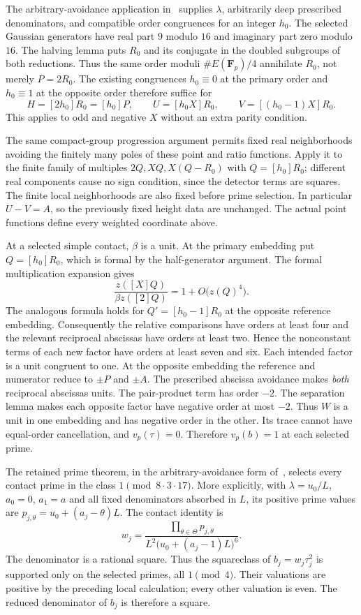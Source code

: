\documentclass[11pt,a4paper]{article}
\begin{document}
The arbitrary-avoidance application in~\cite[Section~2]{Primes}
supplies $\lambda$, arbitrarily deep prescribed denominators, and
compatible order congruences for an integer $h_0$.
The selected Gaussian generators have real part $9$ modulo $16$
and imaginary part zero modulo $16$. The halving lemma
\cite[Section~5]{Half} puts $R_0$ and its conjugate in the doubled
subgroups of both reductions. Thus the same order moduli
$\#E(\mathbf F_p)/4$ annihilate $R_0$, not merely $P=2R_0$.
The existing congruences $h_0\equiv0$ at the primary order and
$h_0\equiv1$ at the opposite order therefore suffice for
\[
 H=[2h_0]R_0=[h_0]P,\qquad U=[h_0X]R_0,\qquad
 V=[(h_0-1)X]R_0.
\]
This applies to odd and negative $X$ without an extra parity condition.

The same compact-group progression argument permits fixed real
neighborhoods avoiding the finitely many poles of these point and
ratio functions. Apply it to the finite family of multiples
$2Q,XQ,X(Q-R_0)$ with $Q=[h_0]R_0$; different real components cause
no sign condition, since the detector terms are squares.
The finite local neighborhoods are also fixed before prime selection.
In particular $U-V=A$, so the previously fixed height data are unchanged.
The actual point functions define every weighted coordinate above.

At a selected simple contact, $\beta$ is a unit. At the primary
embedding put $Q=[h_0]R_0$, which is formal by the half-generator
argument. The formal multiplication expansion gives
\[
             \frac{z([X]Q)}{\beta z([2]Q)}
                         =1+O\bigl(z(Q)^4\bigr).
\]
The analogous formula holds for $Q'=[h_0-1]R_0$ at the opposite
reference embedding. Consequently the relative comparisons have
orders at least four and the relevant reciprocal abscissas have
orders at least two.
Hence the nonconstant terms of each new factor have orders at least
seven and six. Each intended factor is a unit congruent to one.
At the opposite embedding the reference and numerator reduce to
$\pm P$ and $\pm A$. The prescribed abscissa avoidance makes
\emph{both} reciprocal abscissas units. The pair-product term has
order $-2$. The separation lemma makes each opposite factor have
negative order at most $-2$. Thus $W$ is a unit in one embedding
and has negative order in the other. Its trace cannot have
equal-order cancellation, and $v_p(\tau)=0$.
Therefore $v_p(b)=1$ at each selected prime.

The retained prime theorem, in the arbitrary-avoidance form
of~\cite{Primes}, selects every contact prime in the
class $1\pmod{8\cdot3\cdot17}$. More explicitly, with
$\lambda=u_0/L$, $a_0=0$, $a_1=a$ and all fixed denominators
absorbed in $L$, its positive prime values are
$p_{j,\theta}=u_0+(a_j-\theta)L$. The contact identity is
\begin{equation}\label{eq:squareclass}
 w_j=
 \frac{\prod_{\theta\in\Theta}p_{j,\theta}}
      {L^2\bigl(u_0+(a_j-1)L\bigr)^6}.
\end{equation}
The denominator is a rational square. Thus the squareclass of
$b_j=w_j\tau_j^2$ is supported only on the selected primes, all
$1\pmod4$. Their valuations are positive by the preceding local
calculation; every other valuation is even. The reduced denominator
of $b_j$ is therefore a square.
\end{document}
